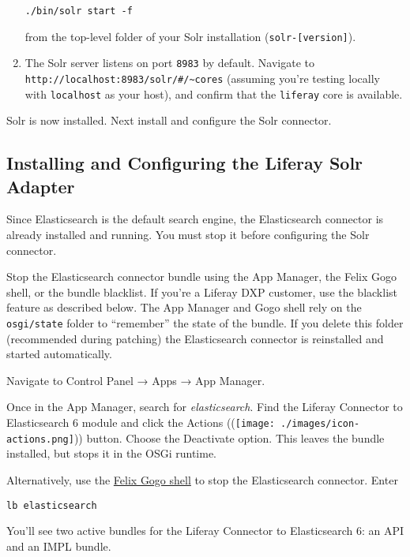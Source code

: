 \begin{enumerate}
\begin{verbatim}
./bin/solr start -f
\end{verbatim}

  from the top-level folder of your Solr installation
  (\texttt{solr-{[}version{]}}).
\item
  The Solr server listens on port \texttt{8983} by default. Navigate to
  \texttt{http://localhost:8983/solr/\#/\textasciitilde{}cores}
  (assuming you're testing locally with \texttt{localhost} as your
  host), and confirm that the \texttt{liferay} core is available.
\end{enumerate}

Solr is now installed. Next install and configure the Solr connector.

\subsection{Installing and Configuring the Liferay Solr
Adapter}\label{installing-and-configuring-the-liferay-solr-adapter}

Since Elasticsearch is the default search engine, the Elasticsearch
connector is already installed and running. You must stop it before
configuring the Solr connector.

Stop the Elasticsearch connector bundle using the App Manager, the Felix
Gogo shell, or the bundle blacklist. If you're a Liferay DXP customer,
use the blacklist feature as described below. The App Manager and Gogo
shell rely on the \texttt{osgi/state} folder to ``remember'' the state
of the bundle. If you delete this folder (recommended during patching)
the Elasticsearch connector is reinstalled and started automatically.

Navigate to Control Panel → Apps → App Manager.

Once in the App Manager, search for \emph{elasticsearch}. Find the
Liferay Connector to Elasticsearch 6 module and click the Actions
((\texttt{[image: ./images/icon-actions.png]})) button. Choose the
Deactivate option. This leaves the bundle installed, but stops it in the
OSGi runtime.

Alternatively, use the
\href{/developer/tutorials/-/knowledge_base/7-1/using-the-felix-gogo-shell}{Felix
Gogo shell} to stop the Elasticsearch connector. Enter

\begin{verbatim}
lb elasticsearch
\end{verbatim}

You'll see two active bundles for the Liferay Connector to Elasticsearch
6: an API and an IMPL bundle.

